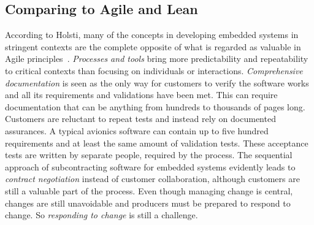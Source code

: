 \documentclass[english]{tktltiki2}
\begin{document}
\subsection{Comparing to Agile and Lean}

According to Holsti, many of the concepts in developing embedded systems in stringent contexts are the complete opposite of what is regarded as valuable in Agile principles~\cite{Hol15b}. \emph{Processes and tools} bring more predictability and repeatability to critical contexts than focusing on individuals or interactions. \emph{Comprehensive documentation} is seen as the only way for customers to verify the software works and all its requirements and validations have been met. This can require documentation that can be anything from hundreds to thousands of pages long. Customers are reluctant to repeat tests and instead rely on documented assurances. A typical avionics software can contain up to five hundred requirements and at least the same amount of validation tests. These acceptance tests are written by separate people, required by the process. The sequential approach of subcontracting software for embedded systems evidently leads to \emph{contract negotiation} instead of customer collaboration, although customers are still a valuable part of the process. Even though managing change is central, changes are still unavoidable and producers must be prepared to respond to change. So \emph{responding to change} is still a challenge.
\end{document}
